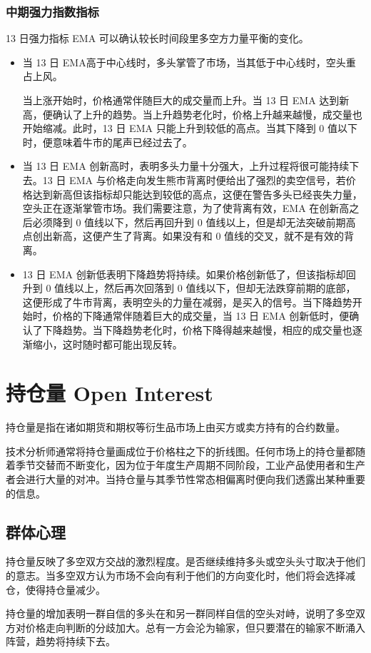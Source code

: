 \subsubsection*{中期强力指数指标}
13 日强力指标 EMA 可以确认较长时间段里多空方力量平衡的变化。
\begin{itemize}
    \item 当 13 日 EMA高于中心线时，多头掌管了市场，当其低于中心线时，空头重占上风。

          当上涨开始时，价格通常伴随巨大的成交量而上升。当 13 日 EMA 达到新高，便确认了上升的趋势。当上升趋势老化时，价格上升越来越慢，成交量也开始缩减。此时，13 日 EMA 只能上升到较低的高点。当其下降到 0 值以下时，便意味着牛市的尾声已经过去了。
    \item 当 13 日 EMA 创新高时，表明多头力量十分强大，上升过程将很可能持续下去。13 日 EMA 与价格走向发生熊市背离时便给出了强烈的卖空信号，若价格达到新高但该指标却只能达到较低的高点，这便在警告多头已经丧失力量，空头正在逐渐掌管市场。我们需要注意，为了使背离有效，EMA 在创新高之后必须降到 0 值线以下，然后再回升到 0 值线以上，但是却无法突破前期高点创出新高，这便产生了背离。如果没有和 0 值线的交叉，就不是有效的背离。
    \item 13 日 EMA 创新低表明下降趋势将持续。如果价格创新低了，但该指标却回升到 0 值线以上，然后再次回落到 0 值线以下，但却无法跌穿前期的底部，这便形成了牛市背离，表明空头的力量在减弱，是买入的信号。当下降趋势开始时，价格的下降通常伴随着巨大的成交量，当 13 日 EMA 创新低时，便确认了下降趋势。当下降趋势老化时，价格下降得越来越慢，相应的成交量也逐渐缩小，这时随时都可能出现反转。
\end{itemize}
\section{持仓量 Open Interest}
持仓量是指在诸如期货和期权等衍生品市场上由买方或卖方持有的合约数量。

技术分析师通常将持仓量画成位于价格柱之下的折线图。任何市场上的持仓量都随着季节交替而不断变化，因为位于年度生产周期不同阶段，工业产品使用者和生产者会进行大量的对冲。当持仓量与其季节性常态相偏离时便向我们透露出某种重要的信息。
\subsection*{群体心理}
持仓量反映了多空双方交战的激烈程度。是否继续维持多头或空头头寸取决于他们的意志。当多空双方认为市场不会向有利于他们的方向变化时，他们将会选择减仓，使得持仓量减少。

持仓量的增加表明一群自信的多头在和另一群同样自信的空头对峙，说明了多空双方对价格走向判断的分歧加大。总有一方会沦为输家，但只要潜在的输家不断涌入阵营，趋势将持续下去。

